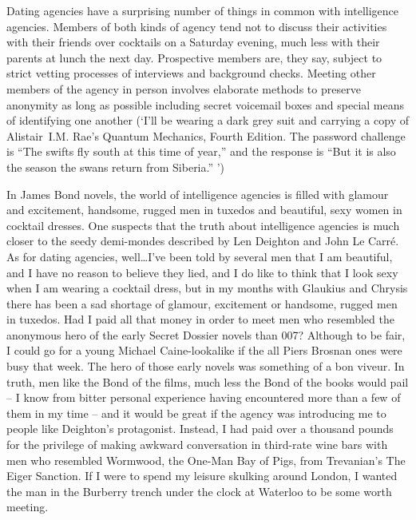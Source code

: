 
\twelverm
Dating agencies have a surprising number of things in common with
intelligence agencies. Members of both kinds of agency tend not to
discuss their activities with their friends over cocktails on a
Saturday evening, much less with their parents at lunch the next
day. Prospective members are, they say, subject to strict vetting
processes of interviews and background checks. Meeting other members
of the agency in person involves elaborate methods to preserve
anonymity as long as possible including secret voicemail boxes and
special means of identifying one another (`I'll be wearing a dark
grey suit and carrying a copy of Alistair~I.M. Rae's {\twelvesl
Quantum Mechanics}, Fourth Edition. The password challenge is ``The
swifts fly south at this time of year,'' and the response is ``But
it is also the season the swans return from Siberia.'' ')

In James Bond novels, the world of intelligence agencies is filled
with glamour and excitement, handsome, rugged men in tuxedos and
beautiful, sexy women in cocktail dresses. One suspects that the
truth about intelligence agencies is much closer to the seedy
demi-mondes described by Len Deighton and John Le Carré. As for
dating agencies, well\dots I've been told by several men that I am
beautiful, and I have no reason to believe they lied, and I do like
to think that I look sexy when I am wearing a cocktail dress, but in
my months with Glaukius and Chrysis there has been a sad shortage of
glamour, excitement or handsome, rugged men in tuxedos. Had I paid
all that money in order to meet men who resembled the anonymous hero
of the early Secret Dossier novels than 007? Although to be fair, I
could go for a young Michael Caine-lookalike if the all Piers
Brosnan ones were busy that week. The hero of those early novels was
something of a {\twelveit bon viveur}. In truth, men like the Bond
of the films, much less the Bond of the books would pail -- I know
from bitter personal experience having encountered more than a few
of them in my time -- and it would be great if the agency was
introducing me to people like Deighton's protagonist. Instead, I had
paid over a thousand pounds for the privilege of making awkward
conversation in third-rate wine bars with men who resembled
Wormwood, the One-Man Bay of Pigs, from Trevanian's {\twelvesl The
Eiger Sanction}. If I were to spend my leisure skulking around
London, I wanted the man in the Burberry trench under the clock at
Waterloo to be some worth meeting.

